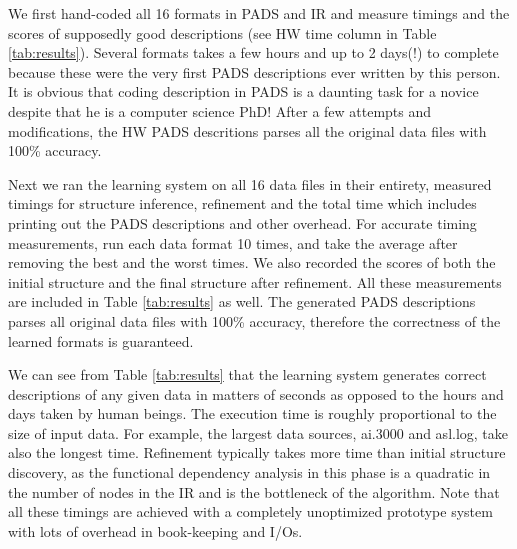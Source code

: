 We first hand-coded all 16 formats in PADS and IR and measure timings and the scores 
of supposedly good descriptions (see HW time column in Table \ref{tab:results}). 
Several formats takes a few hours and up to 2 days(!) to complete because these were the very first 
PADS descriptions ever written by this person. It is obvious that coding description
in PADS is a daunting task for a novice despite that he is a computer science PhD!
After a few attempts and modifications, the HW PADS descritions parses all 
the original data files with 100\% accuracy.

Next we ran the learning system on all 16 data files in their entirety, 
measured timings for structure inference, refinement and the total time which includes
printing out the PADS descriptions and other overhead. 
For accurate timing measurements, run each data format 10 times, and take the average 
after removing the best and the worst times.
We also recorded the scores of both the initial structure and the final structure after refinement.
All these measurements are included in Table \ref{tab:results} as well.
The generated PADS descriptions parses all original data files with 100\% accuracy,
therefore the correctness of the learned formats is guaranteed.

We can see from Table \ref{tab:results} that the learning system
generates correct descriptions of any given data in matters of seconds as opposed to
the hours and days taken by human beings. The execution time is roughly proportional
to the size of input data. For example, the largest data sources, ai.3000 and asl.log,
take also the longest time. Refinement typically takes more time than initial
structure discovery, as the functional dependency analysis in this phase is a quadratic
in the number of nodes in the IR and is the bottleneck of the algorithm. 
Note that all these timings are achieved with a completely unoptimized prototype system
with lots of overhead in book-keeping and I/Os.


